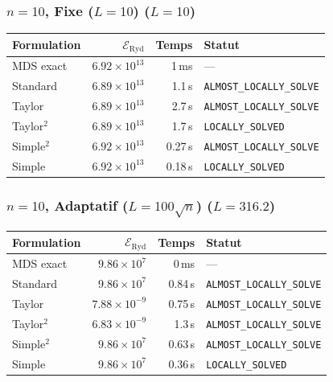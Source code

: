 \subsubsection{$n=10$, Fixe ($L{=}10$) ($L=10$)}
\begin{longtable}{@{}lrrl@{}}
  \toprule
  Formulation & $\mathcal{E}_{\mathrm{Ryd}}$ & Temps & Statut \\
  \midrule
  \endhead
  MDS exact & $6.92\times10^{13}$ & 1\,ms & --- \\
  Standard & $6.89\times10^{13}$ & 1.1\,s & \texttt{ALMOST\_LOCALLY\_SOLVE} \\
  Taylor & $6.89\times10^{13}$ & 2.7\,s & \texttt{ALMOST\_LOCALLY\_SOLVE} \\
  Taylor$^2$ & $6.89\times10^{13}$ & 1.7\,s & \texttt{LOCALLY\_SOLVED} \\
  Simple$^2$ & $6.92\times10^{13}$ & 0.27\,s & \texttt{ALMOST\_LOCALLY\_SOLVE} \\
  Simple & $6.92\times10^{13}$ & 0.18\,s & \texttt{LOCALLY\_SOLVED} \\
  \bottomrule
\end{longtable}

\subsubsection{$n=10$, Adaptatif ($L{=}100\sqrt{n}$) ($L=316.2$)}
\begin{longtable}{@{}lrrl@{}}
  \toprule
  Formulation & $\mathcal{E}_{\mathrm{Ryd}}$ & Temps & Statut \\
  \midrule
  \endhead
  MDS exact & $9.86\times10^{7}$ & 0\,ms & --- \\
  Standard & $9.86\times10^{7}$ & 0.84\,s & \texttt{ALMOST\_LOCALLY\_SOLVE} \\
  Taylor & $7.88\times10^{-9}$ & 0.75\,s & \texttt{ALMOST\_LOCALLY\_SOLVE} \\
  Taylor$^2$ & $6.83\times10^{-9}$ & 1.3\,s & \texttt{ALMOST\_LOCALLY\_SOLVE} \\
  Simple$^2$ & $9.86\times10^{7}$ & 0.63\,s & \texttt{ALMOST\_LOCALLY\_SOLVE} \\
  Simple & $9.86\times10^{7}$ & 0.36\,s & \texttt{LOCALLY\_SOLVED} \\
  \bottomrule
\end{longtable}

